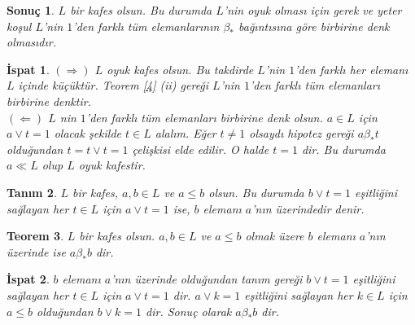 \documentclass[a4paper,12pt]{article}
\numberwithin{equation}{section}
\theoremstyle{italik}
\newtheorem{teorem}{Teorem}[section]
\newtheorem{sonuc}[teorem]{Sonuç}
\newtheorem{tanim}[teorem]{Tanım}
\newtheorem*{ispat}{İspat}
\begin{document}
\begin{sonuc} \label{5}
    $ L $ bir kafes olsun. Bu durumda $ L $'nin oyuk olması için gerek ve yeter koşul $ L $'nin $1$'den farklı tüm 
    elemanlarının $ \beta_* $ bağıntısına göre birbirine denk olmasıdır.
\end{sonuc}
\begin{ispat}
    $ ( \Rightarrow ) $
    $ L $ oyuk kafes olsun. Bu takdirde $ L $'nin $ 1 $'den farklı her elemanı $ L $ içinde küçüktür. 
    Teorem \ref{4} (ii) gereği $ L $'nin $ 1 $'den farklı tüm elemanları birbirine denktir. \\
    $ ( \Leftarrow ) $ 
    $ L $ nin $ 1 $'den farklı tüm elemanları birbirine denk olsun. $ a \in L $ için $ a \vee t = 1 $ olacak şekilde 
    $ t \in L $ alalım. Eğer $ t \neq 1 $ olsaydı hipotez gereği $ a \beta_* t $ olduğundan $ t = t \vee t = 1 $ çelişkisi elde edilir. 
    O halde $ t=1 $ dir. Bu durumda $ a \ll L $ olup $ L $ oyuk kafestir.
\end{ispat}




\begin{tanim}
    $ L $ bir kafes, $ a, b \in L $ ve $ a \leq b $ olsun. Bu durumda $ b \vee t = 1 $ eşitliğini sağlayan her $ t \in L $ için 
    $ a \vee t = 1 $ ise, \textit{$ b $ elemanı $ a $'nın üzerindedir} denir.
\end{tanim}


\begin{teorem}\label{6}
    $ L $ bir kafes olsun. $ a,b \in L $ ve $ a \leq b $ olmak üzere $ b $ elemanı $ a $'nın üzerinde ise $ a \beta_* b $ dir.
\end{teorem}

\begin{ispat}
    $ b $ elemanı $ a $'nın üzerinde olduğundan tanım gereği $ b \vee t = 1 $ eşitliğini sağlayan her $ t \in L $ için $ a \vee t = 1 $ dir. 
    $ a \vee k = 1 $ eşitliğini sağlayan her $ k \in L $ için $ a \leq b $ olduğundan $ b \vee k = 1 $ dir. 
    Sonuç olarak $ a \beta_* b $ dir.
\end{ispat}
\end{document}
